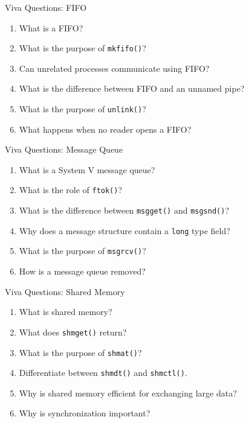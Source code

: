 \documentclass[aspectratio=169,10pt]{beamer}
\begin{document}
\begin{frame}{Viva Questions: FIFO}

\small
\begin{enumerate}
    \item What is a FIFO?
    \item What is the purpose of \texttt{mkfifo()}?
    \item Can unrelated processes communicate using FIFO?
    \item What is the difference between FIFO
    and an unnamed pipe?
    \item What is the purpose of \texttt{unlink()}?
    \item What happens when no reader opens a FIFO?
\end{enumerate}

\end{frame}

\begin{frame}{Viva Questions: Message Queue}

\small
\begin{enumerate}
    \item What is a System V message queue?
    \item What is the role of \texttt{ftok()}?
    \item What is the difference between
    \texttt{msgget()} and \texttt{msgsnd()}?
    \item Why does a message structure
    contain a \texttt{long} type field?
    \item What is the purpose of \texttt{msgrcv()}?
    \item How is a message queue removed?
\end{enumerate}

\end{frame}

\begin{frame}{Viva Questions: Shared Memory}

\small
\begin{enumerate}
    \item What is shared memory?
    \item What does \texttt{shmget()} return?
    \item What is the purpose of \texttt{shmat()}?
    \item Differentiate between
    \texttt{shmdt()} and \texttt{shmctl()}.
    \item Why is shared memory efficient
    for exchanging large data?
    \item Why is synchronization important?
\end{enumerate}

\end{frame}
\end{document}
